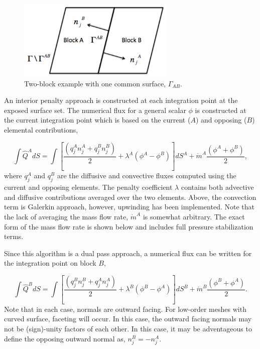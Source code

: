 \begin{figure} 
  \centerline{\includegraphics[height=1.5in]{images/twoBlockDiag.pdf}} 
 \caption{Two-block example with one common surface, $\Gamma_{AB}$.} 
 \label{domainAB} 
\end{figure}    

An interior penalty approach is constructed at each integration point at the 
exposed surface set. The numerical flux for a general scalar $\phi$ is constructed at the 
current integration point which is based on the current ($A$) and opposing ($B$) elemental 
contributions,

\begin{equation} 
        \int \hat Q^A dS = \int [\frac{(q_j^A n_j^A + q_j^B n_j^B)}{2}
				+ \lambda^A ( \phi^A - \phi^B) ]dS^A
        				+ \dot{m}^A \frac{(\phi^A + \phi^B)}{2},
\label{numericalFluxA}
\end{equation}
where $q_j^A$ and $q_j^B$ are the diffusive and convective fluxes computed using the current 
and opposing elements. The penalty coefficient $\lambda$ contains both advective and diffusive 
contributions averaged over the two elements. Above, the convection term is Galerkin approach,
however, upwinding has been implemented. Note that the lack of averaging the mass flow rate, 
$\dot{m}^A$ is somewhat arbitrary. The exact form of the mass flow rate is shown below and includes
full pressure stabilization terms.

Since this algorithm is a dual pass approach, a numerical flux can be written for the integration point on block $B$,

\begin{equation} 
        \int \hat Q^B dS = \int [\frac{(q_j^B n_j^B + q_j^A n_j^A)}{2} 
				+ \lambda^B ( \phi^B - \phi^A) ]dS^B
				+ \dot{m}^B \frac{(\phi^B + \phi^A)}{2}.
\label{numericalFluxB}
\end{equation}
Note that in each case, normals are outward facing. For low-order meshes with curved surface, faceting will occur.
In this case, the outward facing normals may not be (sign)-unity factors of each other. In this case, it
may be adventageous to define the opposing outward normal as, $n_j^B = -n_j^A$. 

